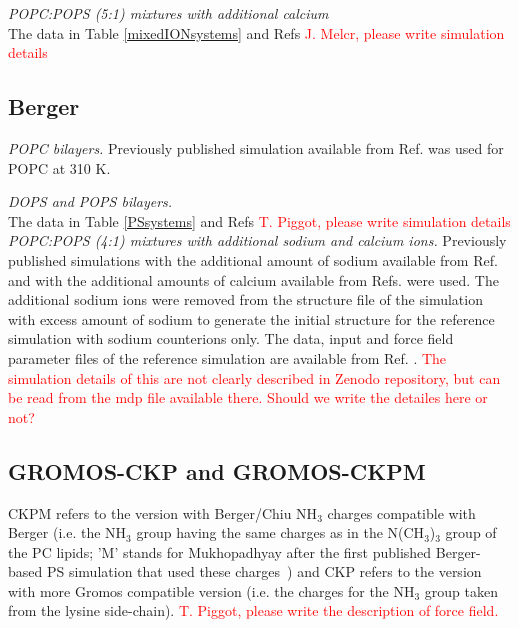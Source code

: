 \documentclass[journal=jpcbfk]{achemso}
\newcommand{\todo}[1]{\textcolor{red}{#1}}
\begin{document}
\noindent
{\it POPC:POPS (5:1) mixtures with additional calcium} \\
The data in Table \ref{mixedIONsystems} and Refs 
\todo{J. Melcr, please write simulation details} \\

\subsection{Berger}
\noindent
{\it POPC bilayers.} 
Previously published simulation \cite{ollila07a} available from Ref. 
was used for POPC at 310 K.

\noindent
{\it DOPS and POPS bilayers.} \\
The data in Table \ref{PSsystems} and Refs 
\todo{T. Piggot, please write simulation details} \\

\noindent
{\it POPC:POPS (4:1) mixtures with additional sodium and calcium ions.} 
Previously published simulations with the additional amount of sodium \cite{jurkiewicz12}
available from Ref.  and with the additional amounts
of calcium \cite{melcrova16} available from Refs. 
were used. The additional sodium ions were removed from the structure file of the simulation
with excess amount of sodium \cite{POPCpopsBERGERwith1000mMNa} to generate the initial structure for the reference simulation
with sodium counterions only. The data, input and force field parameter files of the reference simulation
are available from Ref. . \todo{The simulation details of this are
  not clearly described in Zenodo repository, but can be read from the mdp file available there. Should we
write the detailes here or not?}


\subsection{GROMOS-CKP and GROMOS-CKPM}
  CKPM refers to the version with Berger/Chiu NH$_3$ charges compatible with Berger
   (i.e. the NH$_3$ group having the same charges as in the N(CH$_3$)$_3$ group of the PC lipids;
   'M' stands for Mukhopadhyay after the first published Berger-based PS simulation that used these charges~\cite{mukhopadhyay04})
   and CKP refers to the version with more Gromos compatible version
   (i.e. the charges for the NH$_3$ group taken from the lysine side-chain).
\todo{T. Piggot, please write the description of force field.}
\end{document}
